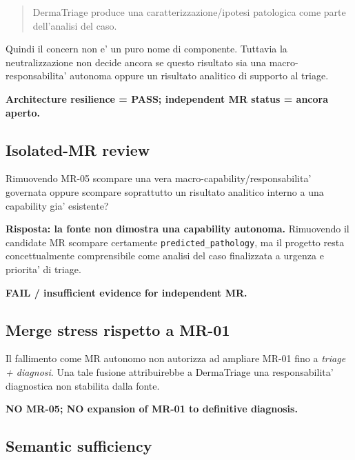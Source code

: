 \documentclass[11pt,a4paper]{article}
\begin{document}
\begin{quote}
DermaTriage produce una caratterizzazione/ipotesi patologica come parte dell'analisi del caso.
\end{quote}

Quindi il concern non e' un puro nome di componente. Tuttavia la neutralizzazione non decide ancora se questo risultato sia una macro-responsabilita' autonoma oppure un risultato analitico di supporto al triage.

\textbf{Architecture resilience = PASS; independent MR status = ancora aperto.}

\subsection{Isolated-MR review}

\begin{ddtacheck}[title={Domanda decisiva}]
Rimuovendo MR-05 scompare una vera macro-capability/responsabilita' governata oppure scompare soprattutto un risultato analitico interno a una capability gia' esistente?
\end{ddtacheck}

\textbf{Risposta: la fonte non dimostra una capability autonoma.} Rimuovendo il candidate MR scompare certamente \texttt{predicted\_pathology}, ma il progetto resta concettualmente comprensibile come analisi del caso finalizzata a urgenza e priorita' di triage.

\begin{ddtaopen}[title={Isolated-MR disposition}]
\textbf{FAIL / insufficient evidence for independent MR.}
\end{ddtaopen}

\subsection{Merge stress rispetto a MR-01}

Il fallimento come MR autonomo non autorizza ad ampliare MR-01 fino a \emph{triage + diagnosi}. Una tale fusione attribuirebbe a DermaTriage una responsabilita' diagnostica non stabilita dalla fonte.

\begin{ddtacore}[title={Merge disposition}]
\textbf{NO MR-05; NO expansion of MR-01 to definitive diagnosis.}
\end{ddtacore}

\subsection{Semantic sufficiency}
\end{document}
